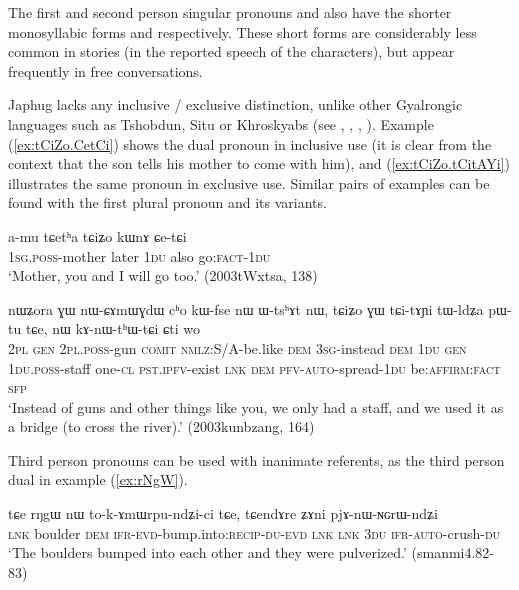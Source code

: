 The first and second person singular pronouns   and  also have the shorter monosyllabic forms  and  respectively. These short forms are considerably less common in stories (in the reported speech of the characters), but appear frequently in free conversations.

Japhug lacks any inclusive / exclusive distinction, unlike other Gyalrongic languages such as Tshobdun, Situ or Khroskyabs (see \citealt{jackson98morphology}, \citealt[177]{linxr93jiarongen}, \citealt[92]{prins16kyomkyo}, \citealt[170]{lai17khroskyabs}). Example  (\ref{ex:tCiZo.CetCi}) shows the dual pronoun  in inclusive use (it is clear from the context that the son tells his mother to come with him), and (\ref{ex:tCiZo.tCitAYi}) illustrates the same pronoun in exclusive use. Similar pairs of examples can be found with the first plural pronoun  and its variants.

\begin{exe}
\ex \label{ex:tCiZo.CetCi}
\gll a-mu tɕetʰa tɕiʑo kɯnɤ ɕe-tɕi \\
\textsc{1sg.poss}-mother later \textsc{1du} also go:\textsc{fact}-\textsc{1du} \\
\glt `Mother, you and I will go too.' (2003tWxtsa, 138)
\end{exe}

\begin{exe}
\ex \label{ex:tCiZo.tCitAYi}
\gll nɯʑora ɣɯ nɯ-ɕɤmɯɣdɯ cʰo kɯ-fse nɯ ɯ-tsʰɤt nɯ, tɕiʑo ɣɯ tɕi-tɤɲi tɯ-ldʑa pɯ-tu tɕe, nɯ kɤ-nɯ-tʰɯ-tɕi ɕti wo \\
\textsc{2pl} \textsc{gen} \textsc{2pl.poss}-gun \textsc{comit} \textsc{nmlz}:S/A-be.like \textsc{dem} \textsc{3sg}-instead \textsc{dem} \textsc{1du} \textsc{gen} \textsc{1du.poss}-staff one-\textsc{cl} \textsc{pst.ipfv}-exist \textsc{lnk} \textsc{dem} \textsc{pfv}-\textsc{auto}-spread-\textsc{1du} be:\textsc{affirm}:\textsc{fact} \textsc{sfp} \\
\glt `Instead of guns and other things like you, we only had a staff, and we used it as a bridge (to cross the river).' (2003kunbzang, 164)
\end{exe}

Third person pronouns can be used with inanimate referents, as the third person dual  in example (\ref{ex:rNgW}).

\begin{exe}
\ex \label{ex:rNgW}
\gll tɕe   	rŋgɯ   	nɯ   	to-k-ɤmɯrpu-ndʑi-ci   	tɕe,   	tɕendɤre   	ʑɤni   	pjɤ-nɯ-ɴɢrɯ-ndʑi   \\
\textsc{lnk} boulder \textsc{dem} \textsc{ifr-evd}-bump.into:\textsc{recip}-\textsc{du-evd} \textsc{lnk} \textsc{lnk} \textsc{3du} \textsc{ifr-auto}-crush-\textsc{du} \\
\glt `The boulders bumped into each other and they were pulverized.' (smanmi4.82-83)
\end{exe}

